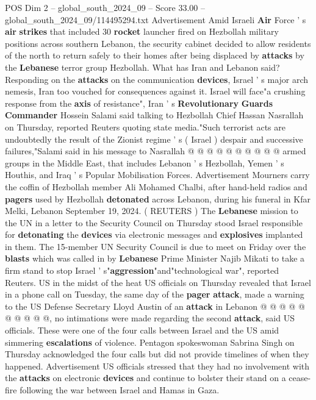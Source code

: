 \begin{textsample}{POS Dim 2 – global\_south\_2024\_09 – Score 33.00 – global\_south\_2024\_09/114495294.txt}
Advertisement Amid Israeli \textbf{Air} Force ' s \textbf{air} \textbf{strikes} that included 30 \textbf{rocket} launcher fired on Hezbollah military positions across southern Lebanon, the security cabinet decided to allow residents of the north to return safely to their homes after being displaced by \textbf{attacks} by the \textbf{Lebanese} terror group Hezbollah.
What has Iran and Lebanon said?
Responding on the \textbf{attacks} on the communication \textbf{devices}, Israel ' s major arch nemesis, Iran too vouched for consequences against it.
Israel will face"a crushing response from the \textbf{axis} of resistance", Iran ' s \textbf{Revolutionary} \textbf{Guards} \textbf{Commander} Hossein Salami said talking to Hezbollah Chief Hassan Nasrallah on Thursday, reported Reuters quoting state media."Such terrorist acts are undoubtedly the result of the Zionist regime ' s ( Israel ) despair and successive failures,"Salami said in his message to Nasrallah @ @ @ @ @ @ @ @ @ @ armed groups in the Middle East, that includes Lebanon ' s Hezbollah, Yemen ' s Houthis, and Iraq ' s Popular Mobilisation Forces.
Advertisement Mourners carry the coffin of Hezbollah member Ali Mohamed Chalbi, after hand-held radios and \textbf{pagers} used by Hezbollah \textbf{detonated} across Lebanon, during his funeral in Kfar Melki, Lebanon September 19, 2024. ( REUTERS ) The \textbf{Lebanese} mission to the UN in a letter to the Security Council on Thursday stood Israel responsible for \textbf{detonating} the \textbf{devices} via electronic messages and \textbf{explosives} implanted in them.
The 15-member UN Security Council is due to meet on Friday over the \textbf{blasts} which was called in by \textbf{Lebanese} Prime Minister Najib Mikati to take a firm stand to stop Israel ' s"\textbf{aggression}"and"technological war", reported Reuters.
US in the midst of the heat US officials on Thursday revealed that Israel in a phone call on Tuesday, the same day of the \textbf{pager} \textbf{attack}, made a warning to the US Defense Secretary Lloyd Austin of an \textbf{attack} in Lebanon @ @ @ @ @ @ @ @ @ @, no intimations were made regarding the second \textbf{attack}, said US officials.
These were one of the four calls between Israel and the US amid simmering \textbf{escalations} of violence.
Pentagon spokeswoman Sabrina Singh on Thursday acknowledged the four calls but did not provide timelines of when they happened.
Advertisement US officials stressed that they had no involvement with the \textbf{attacks} on electronic \textbf{devices} and continue to bolster their stand on a cease-fire following the war between Israel and Hamas in Gaza.

\end{textsample}
